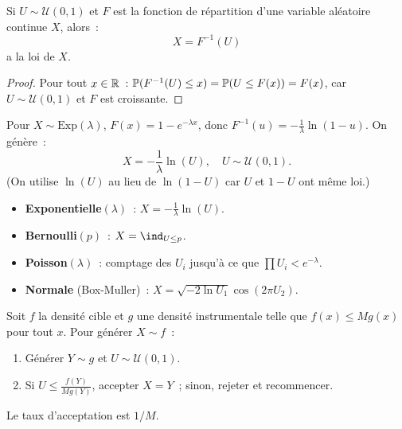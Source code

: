 \begin{theoreme}
Si $U \sim \mathcal{U}(0,1)$ et $F$ est la fonction de r\'epartition d'une
variable al\'eatoire continue $X$, alors~:
\[
  X = F^{-1}(U)
\]
a la loi de $X$.
\end{theoreme}

\begin{proof}
Pour tout $x \in \mathbb{R}$~:
$\mathbb{P}(F^{-1}(U) \leq x) = \mathbb{P}(U \leq F(x)) = F(x)$,
car $U \sim \mathcal{U}(0,1)$ et $F$ est croissante.
\end{proof}

\begin{exemple}
Pour $X \sim \mathrm{Exp}(\lambda)$, $F(x) = 1 - e^{-\lambda x}$, donc
$F^{-1}(u) = -\frac{1}{\lambda} \ln(1-u)$. On g\'en\`ere~:
\[
  X = -\frac{1}{\lambda} \ln(U), \quad U \sim \mathcal{U}(0,1).
\]
(On utilise $\ln(U)$ au lieu de $\ln(1-U)$ car $U$ et $1-U$ ont m\^eme loi.)
\end{exemple}

\begin{formules}[title=\textbf{G\'en\'eration de lois classiques}]
\begin{itemize}
  \item \textbf{Exponentielle}$(\lambda)$~:
        $X = -\frac{1}{\lambda} \ln(U)$.
  \item \textbf{Bernoulli}$(p)$~: $X = \ind_{U \leq p}$.
  \item \textbf{Poisson}$(\lambda)$~: comptage des $U_i$ jusqu'\`a ce que
        $\prod U_i < e^{-\lambda}$.
  \item \textbf{Normale} (Box-Muller)~:
        $X = \sqrt{-2 \ln U_1} \cos(2\pi U_2)$.
\end{itemize}
\end{formules}

\begin{theoreme}
Soit $f$ la densit\'e cible et $g$ une densit\'e instrumentale telle que
$f(x) \leq M g(x)$ pour tout $x$. Pour g\'en\'erer $X \sim f$~:
\begin{enumerate}
  \item G\'en\'erer $Y \sim g$ et $U \sim \mathcal{U}(0,1)$.
  \item Si $U \leq \frac{f(Y)}{M g(Y)}$, accepter $X = Y$~; sinon, rejeter
        et recommencer.
\end{enumerate}
Le taux d'acceptation est $1/M$.
\end{theoreme}

